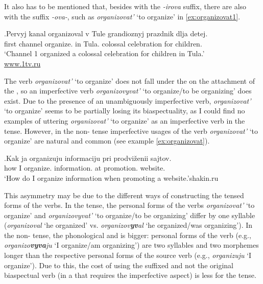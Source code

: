 It also has to be mentioned that, besides  with the \mbox{\textit{-irova}} suffix, there are also  with the suffix \textit{-ova-}, such as \textit{organizovat'} `to organize' in \ref{ex:organizovat1}.\largerpage[-1]

\exg.\label{ex:organizovat1}Pervyj kanal organizoval\textsuperscript{\PF} v Tule grandioznyj prazdnik dlja detej.\\
first channel organize. in Tula. colossal celebration for children.\\
\trans `Channel 1 organized a colossal celebration for children in Tula.'\\\hbox{}\hfill\hbox{\url{www.1tv.ru}}

The verb \textit{organizovat'} `to organize' does not fall under the  on the attachment of the , so an imperfective verb \textit{organizovyvat'}\textsuperscript{\IPF} `to organize/to be organizing' does exist. Due to the presence of an unambiguously imperfective verb, \textit{organizovat'} `to organize' seems to be partially losing its biaspectuality, as I could find no examples of uttering \textit{organizovat'} `to organize' as an imperfective verb in the  tense. However, in the non- tense imperfective usages of the verb \textit{organizovat'} `to organize' are natural and common (see example \ref{ex:organizovat}).

\exg.\label{ex:organizovat}Kak ja organizuju\textsuperscript{\IPF} informaciju pri prodvi\v{z}enii sajtov.\\
how I organize. information. at promotion. website.\\
\trans `How do I organize information when promoting a website.'\hbox{}\hfill\hbox{shakin.ru}

This asymmetry may be due to the different ways of constructing the tensed forms of the verbs. In the  tense, the personal forms of the verbs \textit{organizovat'} `to organize' and \textit{organizovyvat'}\textsuperscript{\IPF} `to organize/to be organizing' differ by one syllable (\textit{organizoval} `he organized' vs. \textit{organizov\textbf{yv}al} `he organized/was organizing'). In the non- tense, the phonological and  is bigger: personal forms of the  verb (e.g., \textit{organizo\textbf{vyva}ju} `I organize/am organizing') are two syllables and two morphemes longer than the respective personal forms of the source verb (e.g., \textit{organizuju} `I organize'). Due to this, the cost of using the suffixed and not the original biaspectual verb (in a  that requires the imperfective aspect) is less for the  tense.

